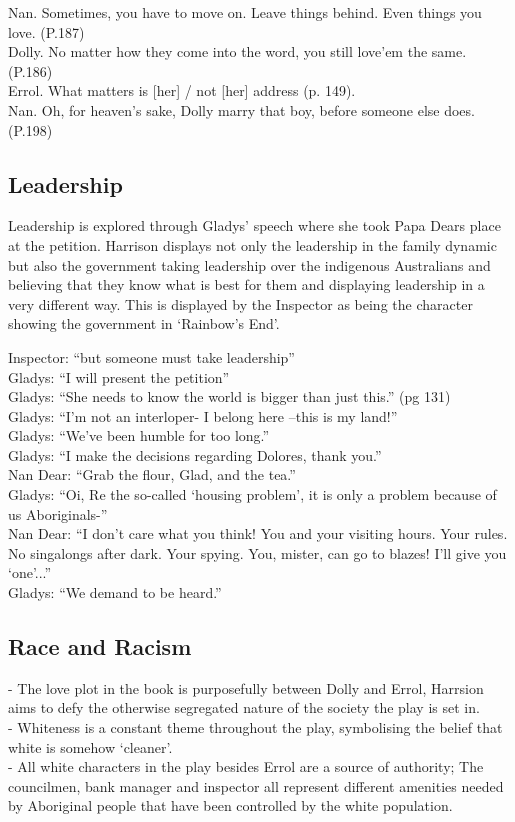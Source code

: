 \documentclass[a4paper]{article}
\begin{document}
Nan. Sometimes, you have to move on. Leave things behind. Even things you love. (P.187) \\
Dolly. No matter how they come into the word, you still love'em the same. (P.186) \\
Errol. What matters is [her] / not [her] address (p. 149). \\
Nan. Oh, for heaven's sake, Dolly marry that boy, before someone else does. (P.198) \\

\subsection{Leadership}
Leadership is explored through Gladys’ speech where she took Papa Dears place at the petition.
Harrison displays not only the leadership in the family dynamic but also the government taking leadership over the indigenous Australians and believing that they know what is best for them and displaying leadership in a very different way. This is displayed by the Inspector as being the character showing the government in ‘Rainbow’s End’.

Inspector: “but someone must take leadership” \\
Gladys: “I will present the petition” \\
Gladys: “She needs to know the world is bigger than just this.” (pg 131) \\
Gladys: “I’m not an interloper- I belong here –this is my land!” \\
Gladys: “We’ve been humble for too long.” \\
Gladys: “I make the decisions regarding Dolores, thank you.” \\
Nan Dear: “Grab the flour, Glad, and the tea.” \\
Gladys: “Oi, Re the so-called ‘housing problem’, it is only a problem because of us Aboriginals-” \\
Nan Dear: “I don’t care what you think! You and your visiting hours. Your rules. No singalongs after dark. Your spying. You, mister, can go to blazes! I’ll give you ‘one’...” \\
Gladys: “We demand to be heard.” \\

\subsection{Race and Racism}
- The love plot in the book is purposefully between Dolly and Errol, Harrsion aims to defy the otherwise segregated nature of the society the play is set in. \\
- Whiteness is a constant theme throughout the play, symbolising the belief that white is somehow ‘cleaner’. \\
- All white characters in the play besides Errol are a source of authority; The councilmen, bank manager and inspector all represent different amenities needed by Aboriginal people that have been controlled by the white population. \\
\end{document}
